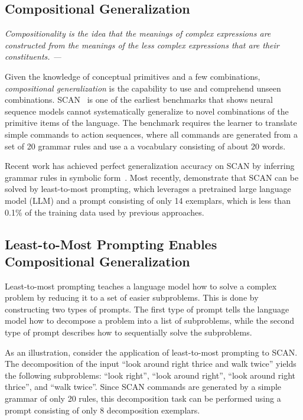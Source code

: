 \documentclass{article} \usepackage{iclr2022_conference,times}
\begin{document}
\subsection{Compositional Generalization}

\begin{center}
    \textit{Compositionality is the idea that the meanings of complex expressions are constructed from the meanings of the less complex expressions that are their constituents. ---\cite{fodor2002compositionality}}
\end{center}

Given the knowledge of conceptual primitives and a few combinations, \textit{compositional generalization} is the capability to use and comprehend unseen combinations. SCAN~\citep{Lake2018GeneralizationWS,loula-etal-2018-rearranging} is one of the earliest benchmarks that shows neural sequence models cannot systematically generalize to novel combinations of the primitive items of the language. The benchmark requires the learner to translate simple commands to action sequences, where all commands are generated from a set of 20 grammar rules and use a a vocabulary consisting of about 20 words.

Recent work has achieved perfect generalization accuracy on SCAN by inferring grammar rules in symbolic form~\citep{xinyun2020neuralsymbolic,nye2020learning,liu2020compositional,shaw2020compositional}. Most recently, \citet{zhou2022leasttomost} demonstrate that SCAN can be solved by least-to-most prompting, which leverages a pretrained large language model (LLM) and a prompt consisting of only 14 exemplars, which is less than 0.1\% of the training data used by previous approaches.


\subsection{Least-to-Most Prompting Enables Compositional Generalization}
Least-to-most prompting teaches a language model how to solve a complex problem by reducing it
to a set of easier subproblems. This is done by constructing two types of prompts. The first type of
prompt tells the language model how to decompose a problem into a list of subproblems, while the second
type of prompt describes how to sequentially solve the subproblems.

As an illustration, consider the application of least-to-most prompting to SCAN. The decomposition of the input ``look around right thrice and walk twice'' yields the following subproblems: ``look right'', ``look around right'', ``look around right thrice'', and ``walk twice''. Since SCAN commands are generated by a simple grammar of only 20 rules, this decomposition task can be performed using a prompt consisting of only 8 decomposition exemplars.
\end{document}
